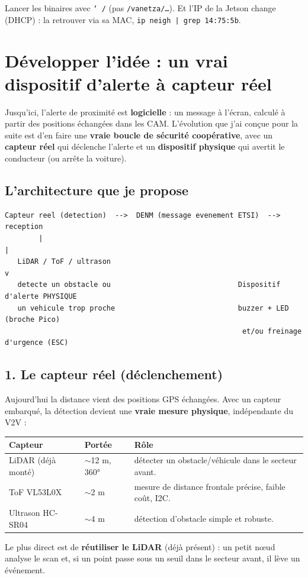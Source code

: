 \documentclass[a4paper,11pt]{article}
\newcommand{\code}[1]{\texttt{#1}}
\begin{document}
\begin{piege}[Chemins et IP]
Lancer les binaires avec \code{\char`~/} (pas \code{/vanetza/\ldots}). Et l'IP de la Jetson
change (DHCP) : la retrouver via sa MAC, \code{ip neigh | grep 14:75:5b}.
\end{piege}

\section{Développer l'idée : un vrai dispositif d'alerte à capteur réel}
Jusqu'ici, l'alerte de proximité est \textbf{logicielle} : un message à l'écran, calculé à
partir des positions échangées dans les CAM. L'évolution que j'ai conçue pour la suite est
d'en faire une \textbf{vraie boucle de sécurité coopérative}, avec un \textbf{capteur réel}
qui déclenche l'alerte et un \textbf{dispositif physique} qui avertit le conducteur (ou arrête
la voiture).

\subsection{L'architecture que je propose}
\begin{lstlisting}
Capteur reel (detection)  -->  DENM (message evenement ETSI)  -->  reception
        |                                                             |
   LiDAR / ToF / ultrason                                             v
   detecte un obstacle ou                              Dispositif d'alerte PHYSIQUE
   un vehicule trop proche                             buzzer + LED (broche Pico)
                                                        et/ou freinage d'urgence (ESC)
\end{lstlisting}

\subsection{1. Le capteur réel (déclenchement)}
Aujourd'hui la distance vient des positions GPS échangées. Avec un capteur embarqué, la
détection devient une \textbf{vraie mesure physique}, indépendante du V2V :
\begin{center}
\begin{tabularx}{\textwidth}{@{}l l X@{}}
\toprule
\textbf{Capteur} & \textbf{Portée} & \textbf{Rôle} \\
\midrule
LiDAR (déjà monté) & $\sim$12 m, 360° & détecter un obstacle/véhicule dans le secteur avant. \\
ToF VL53L0X & $\sim$2 m & mesure de distance frontale précise, faible coût, I2C. \\
Ultrason HC-SR04 & $\sim$4 m & détection d'obstacle simple et robuste. \\
\bottomrule
\end{tabularx}
\end{center}
Le plus direct est de \textbf{réutiliser le LiDAR} (déjà présent) : un petit nœud analyse le
scan et, si un point passe sous un seuil dans le secteur avant, il lève un événement.
\end{document}
